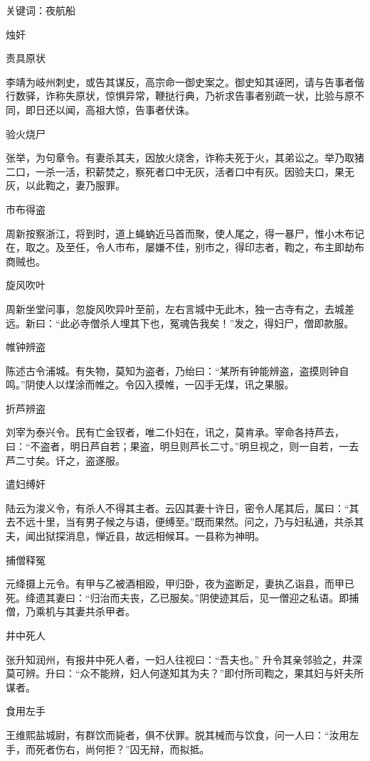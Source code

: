 \documentclass[a4paper,12pt,UTF8,twoside]{ctexbook}
\begin{document}
    关键词：夜航船
    
    烛奸
    
    责具原状
    
    李靖为岐州刺史，或告其谋反，高宗命一御史案之。御史知其诬罔，请与告事者偕行数驿，诈称失原状，惊惧异常，鞭挞行典，乃祈求告事者别疏一状，比验与原不同，即日还以闻，高祖大惊，告事者伏诛。
    
    验火烧尸
    
    张举，为句章令。有妻杀其夫，因放火烧舍，诈称夫死于火，其弟讼之。举乃取猪二口，一杀一活，积薪焚之，察死者口中无灰，活者口中有灰。因验夫口，果无灰，以此鞫之，妻乃服罪。
    
    市布得盗
    
    周新按察浙江，将到时，道上蝇蚋近马首而聚，使人尾之，得一暴尸，惟小木布记在，取之。及至任，令人市布，屡嫌不佳，别市之，得印志者，鞫之，布主即劫布商贼也。
    
    旋风吹叶
    
    周新坐堂问事，忽旋风吹异叶至前，左右言城中无此木，独一古寺有之，去城差远。新曰：“此必寺僧杀人埋其下也，冤魂告我矣！”发之，得妇尸，僧即款服。
    
    帷钟辨盗
    
    陈述古令浦城。有失物，莫知为盗者，乃绐曰：“某所有钟能辨盗，盗摸则钟自鸣。”阴使人以煤涂而帷之。令囚入摸帷，一囚手无煤，讯之果服。
    
    折芦辨盗
    
    刘宰为泰兴令。民有亡金钗者，唯二仆妇在，讯之，莫肯承。宰命各持芦去，曰：“不盗者，明日芦自若；果盗，明旦则芦长二寸。”明旦视之，则一自若，一去芦二寸矣。讦之，盗遂服。
    
    遣妇缚奸
    
    陆云为浚义令，有杀人不得其主者。云囚其妻十许日，密令人尾其后，属曰：“其去不远十里，当有男子候之与语，便缚至。”既而果然。问之，乃与妇私通，共杀其夫，闻出狱探消息，惮近县，故远相候耳。一县称为神明。
    
    捕僧释冤
    
    元绛摄上元令。有甲与乙被酒相殴，甲归卧，夜为盗断足，妻执乙诣县，而甲已死。绛遗其妻曰：“归治而夫丧，乙已服矣。”阴使迹其后，见一僧迎之私语。即捕僧，乃乘机与其妻共杀甲者。
    
    井中死人
    
    张升知润州，有报井中死人者，一妇人往视曰：“吾夫也。” 升令其亲邻验之，井深莫可辨。升曰：“众不能辨，妇人何遂知其为夫？”即付所司鞫之，果其妇与奸夫所谋者。
    
    食用左手
    
    王维熙盐城尉，有群饮而毙者，俱不伏罪。脱其械而与饮食，问一人曰：“汝用左手，而死者伤右，尚何拒？”囚无辩，而拟抵。
    
\end{document}
